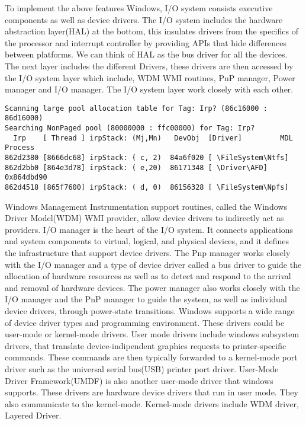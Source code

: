 \documentclass[letterpaper,10pt,draftclsnofoot,onecolumn]{IEEEtran}
\begin{document}
To implement the above features Windows, I/O system consists executive components as well as device drivers.
The I/O system includes the hardware abstraction layer(HAL) at the bottom, this insulates drivers from the specifics of the processor and interrupt controller by providing APIs that hide differences between platforms. We can think of HAL as the bus driver for all the devices. The next layer includes the different Drivers, these drivers are then accessed by the I/O system layer which include, WDM WMI routines, PnP manager, Power manager and I/O manager.
The I/O system layer work closely with each other.
\begin{lstlisting}
Scanning large pool allocation table for Tag: Irp? (86c16000 : 86d16000)
Searching NonPaged pool (80000000 : ffc00000) for Tag: Irp?
  Irp    [ Thread ] irpStack: (Mj,Mn)   DevObj  [Driver]         MDL Process
862d2380 [8666dc68] irpStack: ( c, 2)  84a6f020 [ \FileSystem\Ntfs]
862d2bb0 [864e3d78] irpStack: ( e,20)  86171348 [ \Driver\AFD] 0x864dbd90
862d4518 [865f7600] irpStack: ( d, 0)  86156328 [ \FileSystem\Npfs]

\end{lstlisting}
Windows Management Instrumentation support routines, called the Windows Driver Model(WDM) WMI provider, allow device drivers to indirectly act as providers. I/O manager is the heart of the I/O system. It connects applications and system components to virtual, logical, and physical devices, and it defines the infrastructure that support device drivers. The Pnp manager works closely with the I/O manager and a type of device driver called a bus driver to guide the allocation of hardware resources as well as to detect and respond to the arrival and removal of hardware devices. The power manager also works closely with the I/O manager and the PnP manager to guide the system, as well as individual device drivers, through power-state transitions.
Windows supports a wide range of device driver types and programming environment. These drivers could be user-mode or kernel-mode drivers.
User mode drivers include windows subsystem drivers, that translate device-indipendent graphics requests to printer-specific commands. These commands are then typically forwarded to a kernel-mode port driver such as the universal serial bus(USB) printer port driver. User-Mode Driver Framework(UMDF) is also another user-mode driver that windows supports. These drivers are hardware device drivers that run in user mode. They also communicate to the kernel-mode. 
Kernel-mode drivers include WDM driver, Layered Driver. 
\end{document}
